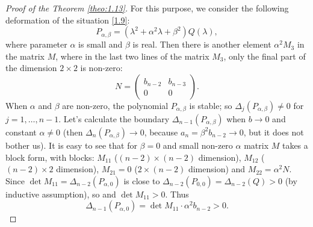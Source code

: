 \begin{proof}[Proof of the Theorem \ref{theo:1.13}]
For this purpose, we consider the following deformation of the situation \eqref{1.9}:
$$P_{\alpha,\beta} = (\lambda^2 + \alpha^2\lambda + \beta^2)Q(\lambda),$$
where parameter $\alpha$ is small and $\beta$ is real. Then there is another element $\alpha^2M_3$ in the matrix $M$, where in the last two lines of the matrix $M_3$, only the final part of the dimension $2 \times 2$ is non-zero:
$$N = \begin{pmatrix}
b_{n-2} & b_{n-3}\\
0 & 0
\end{pmatrix}.$$
When $\alpha$ and $\beta$ are non-zero, the polynomial $P_{\alpha,\beta}$ is stable; so $\Delta_j(P_{\alpha,\beta})\neq 0$ for $j = 1,\ldots, n - 1$. Let's calculate the boundary $\Delta_{n-1}(P_{\alpha,\beta})$ when $b\to 0$ and constant $\alpha\neq 0$ (then $\Delta_{n}(P_{\alpha,\beta}) \to 0$, because $a_n = \beta^2b_{n-2} \to 0$, but it does not bother us). It is easy to see that for $\beta = 0$ and small non-zero $\alpha$ matrix $M$ takes a block form, with blocks: $M_{11}$ ($(n-2)\times(n-2)$ dimension), $M_{12}$ ($(n-2)\times2$ dimension), $M_{21}=0$ ($2\times(n-2)$ dimension) and $M_{22} = \alpha^2N$. Since $\det M_{11} = \Delta_{n-2}(P_{\alpha,0})$ is close to $\Delta_{n-2}(P_{0,0}) = \Delta_{n-2}(Q) > 0$ (by inductive assumption), so and $\det M_{11}> 0$. Thus
$$\Delta_{n-1}(P_{\alpha,0}) = \det M_{11} \cdot \alpha^2b_{n-2} > 0.$$
\end{proof}

